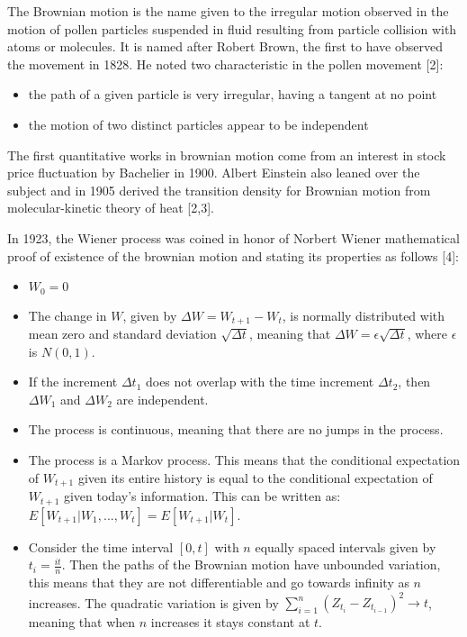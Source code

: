 \documentclass[12pt,twoside]{reedthesis}
\theoremstyle{definition}
\theoremstyle{definition}
\theoremstyle{remark}
\begin{document}
  The Brownian motion is the name given to the irregular motion observed
  in the motion of pollen particles suspended in fluid resulting from
  particle collision with atoms or molecules. It is named after Robert
  Brown, the first to have observed the movement in 1828. He noted two
  characteristic in the pollen movement {[}2{]}:
  \begin{itemize}
  \item
    the path of a given particle is very irregular, having a tangent at no
    point
  \item
    the motion of two distinct particles appear to be independent
  \end{itemize}
  The first quantitative works in brownian motion come from an interest in
  stock price fluctuation by Bachelier in 1900. Albert Einstein also
  leaned over the subject and in 1905 derived the transition density for
  Brownian motion from molecular-kinetic theory of heat {[}2,3{]}.
  
  In 1923, the Wiener process was coined in honor of Norbert Wiener
  mathematical proof of existence of the brownian motion and stating its
  properties as follows {[}4{]}:
  \begin{itemize}
  \item
    \(W_{0}=0\)
  \item
    The change in \(W\), given by \(\Delta W = W_{t+1}-W_{t}\), is
    normally distributed with mean zero and standard deviation
    \(\sqrt{\Delta t}\), meaning that
    \(\Delta W = \epsilon\sqrt{\Delta t}\), where \(\epsilon\) is
    \(N(0,1)\).
  \item
    If the increment \(\Delta t_1\) does not overlap with the time
    increment \(\Delta t_2\), then \(\Delta W_1\) and \(\Delta W_2\) are
    independent.
  \item
    The process is continuous, meaning that there are no jumps in the
    process.
  \item
    The process is a Markov process. This means that the conditional
    expectation of \(W_{t+1}\) given its entire history is equal to the
    conditional expectation of \(W_{t+1}\) given today's information. This
    can be written as: \(E[W_{t+1}|W_1, ..., W_t] = E[W_{t+1}|W_t]\).
  \item
    Consider the time interval \([0,t]\) with \(n\) equally spaced
    intervals given by \(t_i = \frac{it}{n}\). Then the paths of the
    Brownian motion have unbounded variation, this means that they are not
    differentiable and go towards infinity as \(n\) increases. The
    quadratic variation is given by
    \(\sum_{i=1}^{n}{(Z_{t_i}-Z_{t_{i-1}})^2} \rightarrow t\), meaning
    that when \(n\) increases it stays constant at \(t\).
  \end{itemize}
\end{document}
